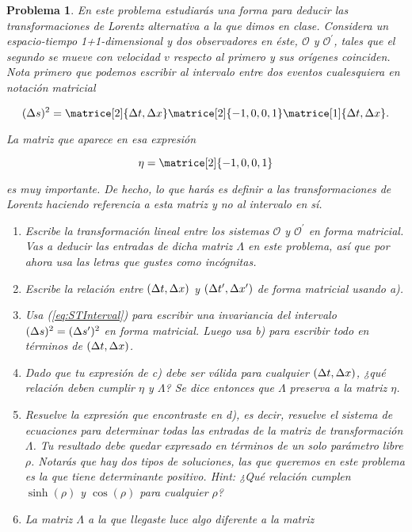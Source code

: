 \documentclass[12pt]{article}
\theoremstyle{break}
\newtheorem{exercise}{Problema}
\theoremstyle{nonumberbreak}
\newcommand*{\observer}{\mathcal{O}}
\newcommand*{\primeobserver}{\mathcal{O}^{\prime}}
\begin{document}
    \begin{exercise}
        En este problema estudiarás una forma para deducir las transformaciones de Lorentz alternativa a la que dimos en clase. Considera un espacio-tiempo 1+1-dimensional y dos observadores en éste, \(\observer\) y \(\primeobserver\), tales que el segundo se mueve con velocidad \(v\) respecto al primero y sus orígenes coinciden. Nota primero que podemos escribir al intervalo entre dos eventos cualesquiera en notación matricial
        
        \begin{equation}
            \interval{s} =
                        \matrice[2]{\change{t}, \change{x}}
                        \matrice[2]{-1, 0, 0, 1}
                        \matrice[1]{\change{t}, \change{x}}.
            \label{eq:STInterval}
        \end{equation}

        La matriz que aparece en esa expresión

        \begin{equation*}
            \eta =
                \matrice[2]{-1, 0, 0, 1}
        \end{equation*}

        es muy importante. De hecho, lo que harás es definir a las transformaciones de Lorentz haciendo referencia a esta matriz y no al intervalo en sí.

        \begin{enumerate}[label = \alph*)]
            \item Escribe la transformación lineal entre los sistemas \(\observer\) y \(\primeobserver\) en forma matricial. Vas a deducir las entradas de dicha matriz \(\Lambda\) en este problema, así que por ahora usa las letras que gustes como incógnitas. 
            \item Escribe la relación entre \((\change{t}, \change{x})\) y \((\change*{t}, \change*{x})\) de forma matricial usando a).
            \item Usa (\ref{eq:STInterval}) para escribir una invariancia del intervalo \(\interval{s} = \interval*{s}\) en forma matricial. Luego usa b) para escribir todo en términos de \((\change{t}, \change{x})\).
            \item Dado que tu expresión de c) debe ser válida para cualquier \((\change{t}, \change{x})\), ¿qué relación deben cumplir \(\eta\) y \(\Lambda\)? Se dice entonces que \(\Lambda\) preserva a la matriz \(\eta\).
            \item Resuelve la expresión que encontraste en d), es decir, resuelve el sistema de ecuaciones para determinar todas las entradas de la matriz de transformación \(\Lambda\). Tu resultado debe quedar expresado en términos de un solo parámetro libre \(\rho\). Notarás que hay dos tipos de soluciones, las que queremos en este problema es la que tiene determinante positivo. \emph{Hint}: ¿Qué relación cumplen \(\sinh(\rho)\) y \(\cos(\rho)\) para cualquier \(\rho\)?
            \item La matriz \(\Lambda\) a la que llegaste luce algo diferente a la matriz
            

\end{enumerate}
\end{exercise}
\end{document}
